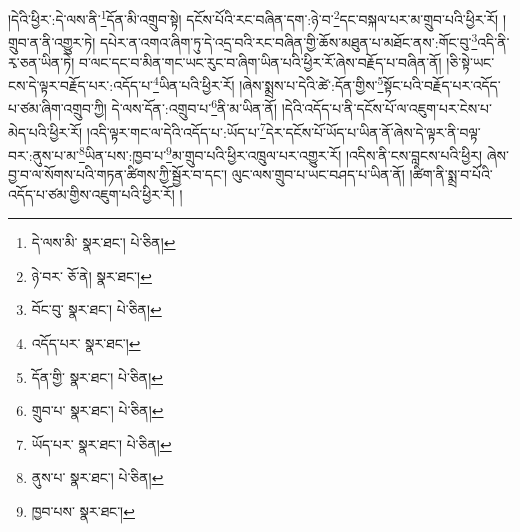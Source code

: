 །དེའི་ཕྱིར་:དེ་ལས་ནི་\footnote{དེ་ལས་མི་  སྣར་ཐང་།  པེ་ཅིན། }དོན་མི་འགྲུབ་སྟེ། དངོས་པོའི་རང་བཞིན་དག་:ཉེ་བ་\footnote{ཉེ་བར་  ཅོ་ནེ།  སྣར་ཐང་། }དང་བསྐལ་པར་མ་གྲུབ་པའི་ཕྱིར་རོ། །གྲུབ་ན་ནི་འགྱུར་ཏེ། དཔེར་ན་འགའ་ཞིག་ཏུ་དེ་འདྲ་བའི་རང་བཞིན་གྱི་ཆོས་མཐུན་པ་མཐོང་ནས་:གོང་བུ་\footnote{བོང་བུ་  སྣར་ཐང་།  པེ་ཅིན། }འདི་ནི་རྭ་ཅན་ཡིན་ཏེ། བ་ལང་དང་བ་མིན་གང་ཡང་རུང་བ་ཞིག་ཡིན་པའི་ཕྱིར་རོ་ཞེས་བརྗོད་པ་བཞིན་ནོ། །ཅི་སྟེ་ཡང་ངས་དེ་ལྟར་བརྗོད་པར་:འདོད་པ་\footnote{འདོད་པར་  སྣར་ཐང་། }ཡིན་པའི་ཕྱིར་རོ། །ཞེས་སྨྲས་པ་དེའི་ཚེ་:དོན་གྱིས་\footnote{དོན་གྱི་  སྣར་ཐང་།  པེ་ཅིན། }སྟོང་པའི་བརྗོད་པར་འདོད་པ་ཙམ་ཞིག་འགྲུབ་ཀྱི། དེ་ལས་དོན་:འགྲུབ་པ་\footnote{གྲུབ་པ་  སྣར་ཐང་།  པེ་ཅིན། }ནི་མ་ཡིན་ནོ། །དེའི་འདོད་པ་ནི་དངོས་པོ་ལ་འཇུག་པར་ངེས་པ་མེད་པའི་ཕྱིར་རོ། །འདི་ལྟར་གང་ལ་དེའི་འདོད་པ་:ཡོད་པ་\footnote{ཡོད་པར་  སྣར་ཐང་།  པེ་ཅིན། }དེར་དངོས་པོ་ཡོད་པ་ཡིན་ནོ་ཞེས་དེ་ལྟར་ནི་བལྟ་བར་:ནུས་པ་མ་\footnote{ནུས་པ་  སྣར་ཐང་།  པེ་ཅིན། }ཡིན་པས་:ཁྱབ་པ་\footnote{ཁྱབ་པས་  སྣར་ཐང་། }མ་གྲུབ་པའི་ཕྱིར་འཁྲུལ་པར་འགྱུར་རོ། །འདིས་ནི་ངས་བླངས་པའི་ཕྱིར། ཞེས་བྱ་བ་ལ་སོགས་པའི་གཏན་ཚིགས་ཀྱི་སྦྱོར་བ་དང་། ལུང་ལས་གྲུབ་པ་ཡང་བཤད་པ་ཡིན་ནོ། །ཚིག་ནི་སྨྲ་བ་པོའི་འདོད་པ་ཙམ་གྱིས་འཇུག་པའི་ཕྱིར་རོ། །
